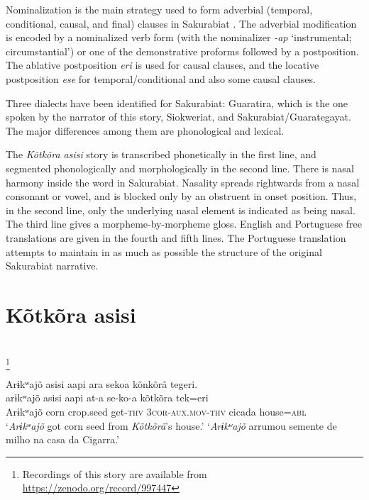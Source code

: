 \documentclass[output=paper,
modfonts,nonflat
]{langsci/langscibook}
\begin{document}
Nominalization is the main strategy used to form adverbial (temporal, conditional, causal, and final) clauses in Sakurabiat \citep{Galucio2011}. The adverbial modification is encoded by a nominalized verb form (with the nominalizer \textit{-ap} ‘instrumental; circumstantial’) or one of the demonstrative proforms followed by a postposition. The ablative postposition \textit{eri} is used for causal clauses, and the locative postposition \textit{ese} for temporal/conditional and also some causal clauses. 

Three dialects have been identified for Sakurabiat: Guaratira, which is the one spoken by the narrator of this story, Siokweriat, and Sakurabiat/Guarategayat. The major differences among them are phonological and lexical.

The \textit{Kõtkõra asisi} story is transcribed phonetically in the first line, and segmented phonologically and  morphologically in the second line. There is nasal harmony inside the word in Sakurabiat. 
Nasality spreads rightwards from a nasal consonant or vowel, and is blocked only by an obstruent in onset position.
Thus, in the second line, only the underlying nasal element is indicated as being nasal.
The third line gives a morpheme-by-morpheme gloss. English and Portuguese free translations are given in the fourth and fifth lines. The Portuguese translation attempts to maintain in as much as possible the structure of the original Sakurabiat narrative. 








\section{Kõtkõra asisi}
\\

\footnote{Recordings of this story are available from \url{https://zenodo.org/record/997447}}
 

\ea Arɨkʷajõ asisi aapi ara sekoa kõnkõrã tegeri.\\[.3em]
\gll arɨkʷajõ asisi aapi at-a se-ko-a kõtkõra tek=eri\\
     Arɨkʷajõ corn crop.seed get-\textsc{thv} \textsc{3cor-aux.mov-thv} cicada house=\textsc{abl}\\
\glt ‘\textit{Arɨkʷajõ} got corn seed from \textit{Kõtkõrã}'s house.’ 
\glt ‘\textit{Arɨkʷajõ} arrumou semente de milho na casa da Cigarra.’
\z 
\end{document}
